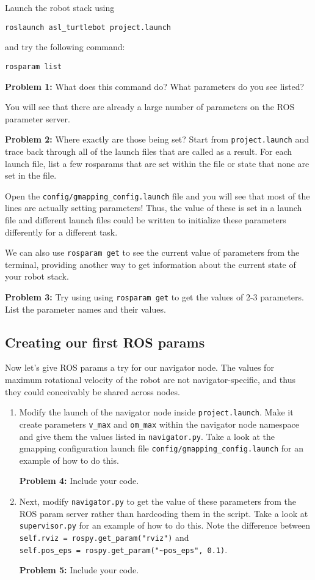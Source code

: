 \documentclass{article}
\begin{document}
Launch the robot stack using 
\begin{lstlisting}
roslaunch asl_turtlebot project.launch
\end{lstlisting}
and try the following command:
\begin{lstlisting}
rosparam list
\end{lstlisting}
\textbf{Problem 1:} What does this command do? What parameters do you see listed?

You will see that there are already a large number of parameters on the ROS parameter server. 

\textbf{Problem 2: } Where exactly are those being set? Start from \texttt{project.launch} and trace back through all of the launch files that are called as a result. For each launch file, list a few rosparams that are set within the file or state that none are set in the file.

Open the \texttt{config/gmapping\_config.launch} file and you will see that most of the lines are actually setting parameters! Thus, the value of these is set in a launch file and different launch files could be written to initialize these parameters differently for a different task.

We can also use \texttt{rosparam get} to see the current value of parameters from the terminal, providing another way to get information about the current state of your robot stack. 

\textbf{Problem 3: } Try using using \texttt{rosparam get} to get the values of 2-3 parameters. List the parameter names and their values.

\subsection{Creating our first ROS params}

Now let's give ROS params a try for our navigator node. The values for maximum rotational velocity of the robot are not navigator-specific, and thus they could conceivably be shared across nodes. 
\begin{enumerate}
    \item Modify the launch of the navigator node inside \texttt{project.launch}. Make it create parameters \texttt{v\_max} and \texttt{om\_max} within the navigator node namespace and give them the values listed in \texttt{navigator.py}. Take a look at the gmapping configuration launch file \texttt{config/gmapping\_config.launch} for an example of how to do this.
    
    \textbf{Problem 4:} Include your code.
    
    \item Next, modify \texttt{navigator.py} to get the value of these parameters from the ROS param server rather than hardcoding them in the script. Take a look at \texttt{supervisor.py} for an example of how to do this. Note the difference between \lstinline{self.rviz = rospy.get_param("rviz")} and \\ \lstinline{self.pos_eps = rospy.get_param("~pos_eps", 0.1)}.
    
    \textbf{Problem 5:} Include your code.
\end{enumerate}  
\end{document}
